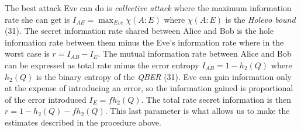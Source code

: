 The best attack Eve can do is \textit{collective attack} where the maximum information rate she can get is  $I_{AE} = \max_{Eve} \chi(A:E)$ where $\chi(A:E)$ is the \textit{Holevo bound} (31).  The secret information rate shared between Alice and Bob is the hole information rate between them minus the Eve's information rate where in the worst case is $r = I_{AB} - I_{E}$. The mutual information rate between Alice and Bob can be expressed as total rate minus the error entropy $I_{AB} = 1 - h_2(Q)$ where $h_2(Q)$ is the binary entropy of the \textit{QBER} (31). Eve can gain information only at the expense of introducing an error, so the information gained is proportional of the error introduced $I_E = f h_2(Q)$. The total rate secret information is then $r = 1 - h_2(Q) - f h_2(Q)$. This last parameter is what allows us to make the estimates described in the procedure above.





